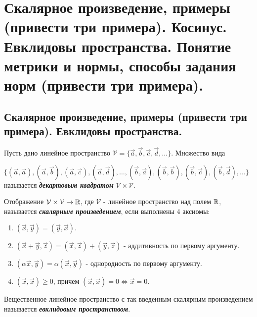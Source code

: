 \section{
    Скалярное произведение, примеры (привести три примера). Косинус. Евклидовы пространства. Понятие метрики и нормы, способы задания норм (привести три примера). 
}

\subsection{
    Скалярное произведение, примеры (привести три примера). Евклидовы пространства.
}

\begin{definition}
    Пусть дано линейное пространство $\mathcal{V} = \{\vec{a}, \vec{b}, \vec{c}, \vec{d}, \dots\}$. Множество вида 
    
    $\{(\vec{a}, \vec{a}), (\vec{a}, \vec{b}), (\vec{a}, \vec{c}), (\vec{a}, \vec{d}), \dots, (\vec{b}, \vec{a}), (\vec{b}, \vec{b}), (\vec{b}, \vec{c}), (\vec{b}, \vec{d}), \dots\}$ называется \textbf{\textit{декартовым квадратом}} $\mathcal{V} \times \mathcal{V}$.
\end{definition}

\begin{definition}
    Отображение $\mathcal{V} \times \mathcal{V} \to \mathbb{R}$, где $\mathcal{V}$ - линейное пространство над полем $\mathbb{R}$, называется \textbf{\textit{скалярным произведением}}, если выполнены 4 аксиомы:
    \begin{enumerate}[nosep]
        \item $(\vec{x}, \vec{y}) = (\vec{y}, \vec{x})$.
        \item $(\vec{x} + \vec{y}, \vec{z}) = (\vec{x}, \vec{z}) + (\vec{y}, \vec{z})$ - аддитивность по первому аргументу.
        \item $(\alpha \vec{x}, \vec{y}) = \alpha(\vec{x}, \vec{y})$ - однородность по первому аргументу.
        \item $(\vec{x}, \vec{x}) \geq 0$, причем $(\vec{x}, \vec{x}) = 0 \iff \vec{x} = 0$.
    \end{enumerate}
\end{definition}

\begin{definition}
    Вещественное линейное пространство с так введенным скалярным произведением называется \textbf{\textit{евклидовым пространством}}.
\end{definition}

